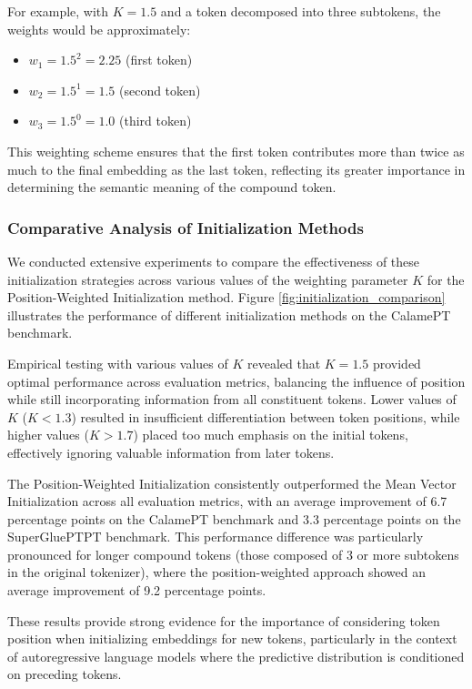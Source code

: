 For example, with $K = 1.5$ and a token decomposed into three subtokens, the weights would be approximately:
\begin{itemize}
    \item $w_1 = 1.5^2 = 2.25$ (first token)
    \item $w_2 = 1.5^1 = 1.5$ (second token)
    \item $w_3 = 1.5^0 = 1.0$ (third token)
\end{itemize}

This weighting scheme ensures that the first token contributes more than twice as much to the final embedding as the last token, reflecting its greater importance in determining the semantic meaning of the compound token.

\subsubsection{Comparative Analysis of Initialization Methods}
We conducted extensive experiments to compare the effectiveness of these initialization strategies across various values of the weighting parameter $K$ for the Position-Weighted Initialization method. Figure \ref{fig:initialization_comparison} illustrates the performance of different initialization methods on the CalamePT benchmark.

Empirical testing with various values of $K$ revealed that $K = 1.5$ provided optimal performance across evaluation metrics, balancing the influence of position while still incorporating information from all constituent tokens. Lower values of $K$ ($K < 1.3$) resulted in insufficient differentiation between token positions, while higher values ($K > 1.7$) placed too much emphasis on the initial tokens, effectively ignoring valuable information from later tokens.

The Position-Weighted Initialization consistently outperformed the Mean Vector Initialization across all evaluation metrics, with an average improvement of 6.7 percentage points on the CalamePT benchmark and 3.3 percentage points on the SuperGluePTPT benchmark. This performance difference was particularly pronounced for longer compound tokens (those composed of 3 or more subtokens in the original tokenizer), where the position-weighted approach showed an average improvement of 9.2 percentage points.

These results provide strong evidence for the importance of considering token position when initializing embeddings for new tokens, particularly in the context of autoregressive language models where the predictive distribution is conditioned on preceding tokens.

